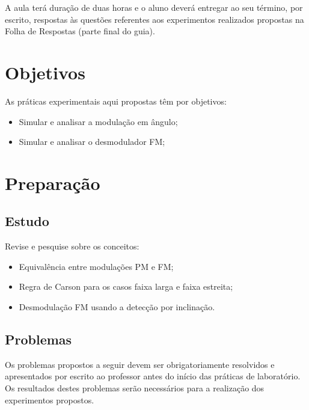 \documentclass[12pt,addpoints]{exam}
\begin{document}
A aula terá duração de duas horas e o aluno deverá entregar ao seu término, por escrito, respostas às questões referentes aos experimentos realizados propostas na Folha de Respostas (parte final do guia).

\section{Objetivos}

As práticas experimentais aqui propostas têm por objetivos:
\begin{itemize}
    \item Simular e analisar a modulação em ângulo;
    \item Simular e analisar o desmodulador FM;
\end{itemize}

\section{Preparação} \label{sect:Preparacao}

\subsection{Estudo}

Revise e pesquise sobre os conceitos:
\begin{itemize}
    \item Equivalência entre modulações PM e FM;
    \item Regra de Carson para os casos faixa larga e faixa estreita;
    \item Desmodulação FM usando a detecção por inclinação.
\end{itemize}

\subsection{Problemas}

Os problemas propostos a seguir devem ser obrigatoriamente resolvidos e apresentados por escrito ao professor antes do início das práticas de laboratório. Os resultados destes problemas serão necessários para a realização dos experimentos propostos. 
\end{document}
